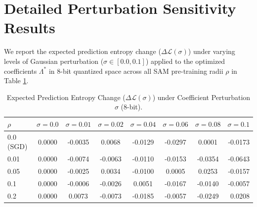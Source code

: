 \documentclass{article}
\theoremstyle{plain}
\theoremstyle{definition}
\theoremstyle{remark}
\begin{document}
\newpage
\section{Detailed Perturbation Sensitivity Results}
\label{sec:appendix_sensitivity}

We report the expected prediction entropy change ($\Delta \mathcal{L}(\sigma)$) under varying levels of Gaussian perturbation ($\sigma \in [0.0, 0.1]$) applied to the optimized coefficients $\Lambda^*$ in 8-bit quantized space across all SAM pre-training radii $\rho$ in Table \ref{tab:results_curvature}.

\begin{table}[htbp]
\caption{Expected Prediction Entropy Change ($\Delta \mathcal{L}(\sigma)$) under Coefficient Perturbation $\sigma$ (8-bit).}
\label{tab:results_curvature}
\vskip 0.15in
\centering
\begin{small}
\begin{sc}
\begin{tabular}{lccccccr}
\toprule
$\rho$ & $\sigma=0.0$ & $\sigma=0.01$ & $\sigma=0.02$ & $\sigma=0.04$ & $\sigma=0.06$ & $\sigma=0.08$ & $\sigma=0.1$ \\
\midrule
0.0 (SGD) & 0.0000 & -0.0035 & 0.0068 & -0.0129 & -0.0297 & 0.0001 & -0.0173 \\
0.01      & 0.0000 & -0.0074 & -0.0063 & -0.0110 & -0.0153 & -0.0354 & -0.0643 \\
0.05      & 0.0000 & -0.0025 & 0.0034 & -0.0100 & 0.0005 & 0.0253 & -0.0157 \\
0.1       & 0.0000 & -0.0006 & -0.0026 & 0.0051 & -0.0167 & -0.0140 & -0.0057 \\
0.2       & 0.0000 & 0.0073 & -0.0073 & -0.0185 & -0.0057 & -0.0249 & 0.0208 \\
\bottomrule
\end{tabular}
\end{sc}
\end{small}
\vskip -0.1in
\end{table}

\end{document}
